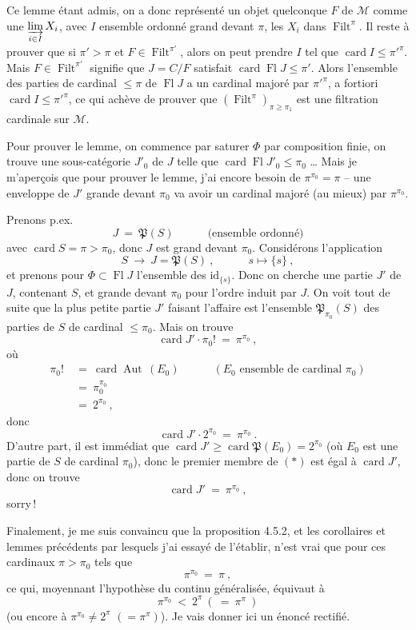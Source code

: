 \documentclass[11pt]{article}
\newcommand{\printedpage}[1]{\if\relax\detokenize{#1}\relax\else\marginpar{\footnotesize p.~#1}\fi}
\newcommand{\msp}[1]{\marginpar{\footnotesize [#1]}}
\newcommand{\card}{\operatorname{card}}
\newcommand{\Fl}{\operatorname{Fl}}
\newcommand{\Filt}{\operatorname{Filt}}
\newcommand{\Aut}{\operatorname{Aut}}
\begin{document}
Ce lemme étant admis, on a donc représenté un objet quelconque $F$ de $\mathcal{M}$ comme une $\varinjlim\limits_{i\in I} X_i$, avec $I$ ensemble ordonné grand devant $\pi$, les $X_i$ dans $\Filt^{\pi}$. Il reste à prouver que si $\pi' > \pi$ et $F \in \Filt^{\pi'}$, alors on peut prendre $I$ tel que $\card I \leqslant \pi'^{\pi}$. Mais $F \in \Filt^{\pi'}$ signifie que $J = C/F$ satisfait $\card\Fl J \leqslant \pi'$. Alors l'ensemble des parties de cardinal $\leqslant \pi$ de $\Fl J$ a un cardinal majoré par $\pi'^{\pi}$, a fortiori $\card I \leqslant \pi'^{\pi}$, ce qui achève de prouver que $(\Filt^{\pi})_{\pi\geqslant\pi_1}$ est une filtration cardinale sur $\mathcal{M}$.

\msp{page 114}

Pour prouver le lemme, on commence par saturer $\Phi$ par composition finie, on trouve une sous-catégorie $J'_0$ de $J$ telle que $\card\Fl J'_0 \leqslant \pi_0$ \ldots{} Mais je m'aperçois que pour prouver le lemme, j'ai encore besoin de $\pi^{\pi_0} = \pi$ -- une enveloppe de $J'$ grande devant $\pi_0$ va avoir un cardinal majoré (au mieux) par $\pi^{\pi_0}$.

Prenons p.ex.
\[
J \ =\ \mathfrak{P}(S) \qquad\quad \text{(ensemble ordonné)}
\]
avec $\card S = \pi > \pi_0$, donc $J$ est grand devant $\pi_0$. Considérons l'application
\[
S \ \longrightarrow\ J = \mathfrak{P}(S)\ , \qquad\quad s \longmapsto \{s\}\ ,
\]
et prenons pour $\Phi \subset \Fl J$ l'ensemble des $\mathrm{id}_{\{s\}}$. Donc on cherche une partie $J'$ de $J$, contenant $S$, et grande devant $\pi_0$ pour l'ordre induit par $J$. On voit tout de suite que la plus petite partie $J'$ faisant l'affaire est l'ensemble $\mathfrak{P}_{\pi_0}(S)$ des parties de $S$ de cardinal $\leqslant \pi_0$. Mais on trouve
\[
\card J' \cdot \pi_0! \ =\ \pi^{\pi_0}\ ,
\]
\printedpage{33}
\msp{page 115}
où
\[
\begin{aligned}
\pi_0! \ &=\ \card\Aut\,(E_0) \qquad\quad (E_0 \text{ ensemble de cardinal } \pi_0)\\
&=\ \pi_0^{\pi_0}\\
&=\ 2^{\pi_0}\ ,
\end{aligned}
\]
donc
\[
\card J' \cdot 2^{\pi_0} \ =\ \pi^{\pi_0}\ .
\tag*{$(*)$}
\]
D'autre part, il est immédiat que $\card J' \geqslant \card\mathfrak{P}(E_0) = 2^{\pi_0}$ (où $E_0$ est une partie de $S$ de cardinal $\pi_0$), donc le premier membre de $(*)$ est égal à $\card J'$, donc on trouve
\[
\card J' \ =\ \pi^{\pi_0}\ ,
\]
sorry\,!

Finalement, je me suis convaincu que la proposition 4.5.2, et les corollaires et lemmes précédents par lesquels j'ai essayé de l'établir, n'est vrai que pour ces cardinaux $\pi > \pi_0$ tels que
\[
\pi^{\pi_0} \ =\ \pi\ ,
\]
ce qui, moyennant l'hypothèse du continu généralisée, équivaut à
\[
\pi^{\pi_0} \ <\ 2^{\pi}\ (\ =\ \pi^{\pi}\ )
\]
(ou encore à $\pi^{\pi_0} \neq 2^{\pi}$ $(= \pi^{\pi})$). Je vais donner
\msp{page 116}
ici un énoncé rectifié.
\end{document}
